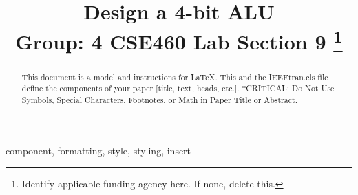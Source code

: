 \documentclass[conference]{IEEEtran}
\begin{document}
    \title{Design a 4-bit ALU\\
    {\footnotesize \textsuperscript{}Group: 4 CSE460 Lab Section 9}
    \thanks{Identify applicable funding agency here. If none, delete this.}
    }

    \author{
    \and
    \and
    \and
    \and
    }

    \maketitle

    \begin{abstract}
        This document is a model and instructions for \LaTeX.
        This and the IEEEtran.cls file define the components of your paper [title, text, heads, etc.]. *CRITICAL: Do Not Use Symbols, Special Characters, Footnotes,
        or Math in Paper Title or Abstract.
    \end{abstract}

    \begin{IEEEkeywords}
        component, formatting, style, styling, insert
    \end{IEEEkeywords}
\end{document}
